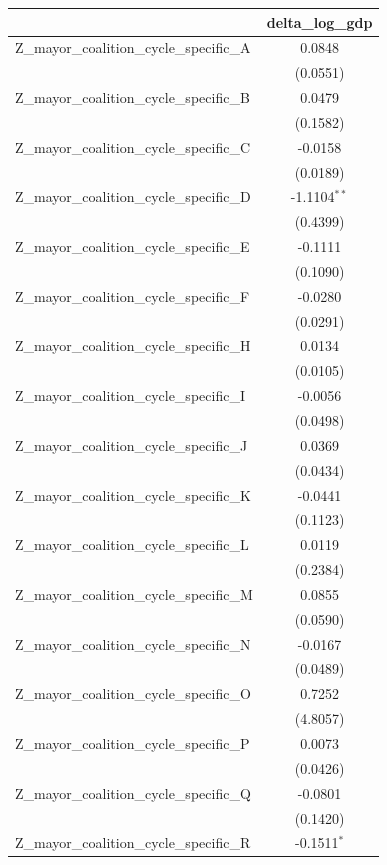 \begin{tabular}{lc}
\toprule
 & delta\_log\_gdp \\
\midrule
Z\_mayor\_coalition\_cycle\_specific\_A & 0.0848 \\
 & (0.0551) \\
Z\_mayor\_coalition\_cycle\_specific\_B & 0.0479 \\
 & (0.1582) \\
Z\_mayor\_coalition\_cycle\_specific\_C & -0.0158 \\
 & (0.0189) \\
Z\_mayor\_coalition\_cycle\_specific\_D & -1.1104$^{**}$ \\
 & (0.4399) \\
Z\_mayor\_coalition\_cycle\_specific\_E & -0.1111 \\
 & (0.1090) \\
Z\_mayor\_coalition\_cycle\_specific\_F & -0.0280 \\
 & (0.0291) \\
Z\_mayor\_coalition\_cycle\_specific\_H & 0.0134 \\
 & (0.0105) \\
Z\_mayor\_coalition\_cycle\_specific\_I & -0.0056 \\
 & (0.0498) \\
Z\_mayor\_coalition\_cycle\_specific\_J & 0.0369 \\
 & (0.0434) \\
Z\_mayor\_coalition\_cycle\_specific\_K & -0.0441 \\
 & (0.1123) \\
Z\_mayor\_coalition\_cycle\_specific\_L & 0.0119 \\
 & (0.2384) \\
Z\_mayor\_coalition\_cycle\_specific\_M & 0.0855 \\
 & (0.0590) \\
Z\_mayor\_coalition\_cycle\_specific\_N & -0.0167 \\
 & (0.0489) \\
Z\_mayor\_coalition\_cycle\_specific\_O & 0.7252 \\
 & (4.8057) \\
Z\_mayor\_coalition\_cycle\_specific\_P & 0.0073 \\
 & (0.0426) \\
Z\_mayor\_coalition\_cycle\_specific\_Q & -0.0801 \\
 & (0.1420) \\
Z\_mayor\_coalition\_cycle\_specific\_R & -0.1511$^{*}$ \\

\end{tabular}
